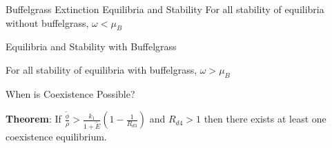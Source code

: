 \documentclass{beamer}
\begin{document}

\begin{frame}{Buffelgrass Extinction Equilibria and Stability}
\footnotesize{For all stability of equilibria without buffelgrass, $\omega < \mu_B$}\newline
\newline
\hspace{-.2cm}

\end{frame}

\begin{frame}{Equilibria and Stability with Buffelgrass}
\footnotesize{
For all stability of equilibria with buffelgrass, $\omega > \mu_B$

\hspace{-.2cm}
}
\end{frame}

\begin{frame}{When is Coexistence Possible?}

{\textbf{Theorem}: If $\displaystyle\frac{\tilde{\phi}}{\rho} > \displaystyle\frac{k_1}{1+\tilde{E}}\left(1-\frac{1}{R_{d3}}\right)$ and $R_{d4} > 1$ then there exists at least one coexistence equilibrium.\newline
}
\end{frame}

\end{document}
